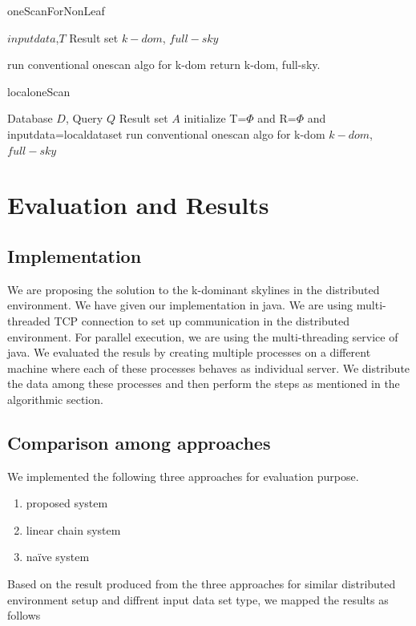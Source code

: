 \documentclass[twocolumn]{article}
\newcommand{\comment}[1]{}
\begin{document}
\begin{algorithm}
	\caption{ oneScanForNonLeaf}
	\label{alg:oneScanForNonLeaf}
	\begin{algorithmic}[1]
		\Require $inputdata$,$T$
		\Ensure Result set $k-dom$, $full-sky$
		\comment {all k-dom and full-skyline of the child nodes so as to merge them into the result }
		\State run conventional onescan algo for k-dom
		\State return k-dom, full-sky.
	\end{algorithmic}
\end{algorithm}

\begin{algorithm}
	\caption{localoneScan}
	\label{alg:localoneScan}
	\begin{algorithmic}[1]
		\Require Database $D$, Query $Q$
		\Ensure Result set $A$
		\State initialize T=\(\Phi\) and R=\(\Phi\) and inputdata=localdataset
		\State run conventional onescan algo for k-dom
		\State \Return $k-dom$,$full-sky$
	\end{algorithmic}
\end{algorithm}
\section{Evaluation and Results}
\label{evaluationandresults}
\subsection{Implementation}
We are proposing the solution to the k-dominant skylines in the distributed environment. We have given our implementation in java. We are using multi-threaded TCP connection to set up communication in the distributed environment.
For parallel execution, we are using the multi-threading service of java. We evaluated the resuls by creating multiple processes on a different machine where each of these processes behaves as individual server. We distribute the data among these processes and then perform the steps as mentioned in the algorithmic section.
\subsection{Comparison among approaches}
We implemented the following three approaches for evaluation purpose. 
\begin{enumerate}
\item proposed system
\item linear chain system
\item naïve system
\end{enumerate}
Based on the result produced from the three approaches for similar distributed environment setup and diffrent input data set type, we mapped the results as follows
\end{document}
